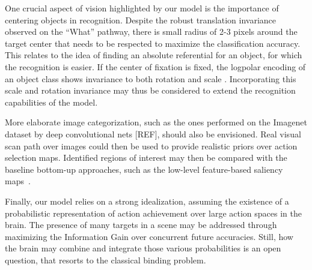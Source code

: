 


One crucial aspect of vision highlighted by our model is the importance of centering objects in recognition. Despite the robust translation invariance observed on the ``What'' pathway, there is small radius of 2-3 pixels around the target center that needs to be respected to maximize the classification accuracy. This relates to the idea of finding an absolute referential for an object, for which the recognition is easier. If the center of fixation is fixed, the logpolar encoding of an object class shows invariance to both rotation and scale \citep{Traver10}. Incorporating this scale and rotation invariance may thus be considered to extend the recognition capabilities of the model.

More elaborate image categorization, such as the ones performed on the Imagenet dataset by deep convolutional nets [REF], should also be envisioned.
Real visual scan path over images could then be used to provide realistic priors over action selection maps.  %
Identified regions of interest may then be compared with the baseline bottom-up approaches, such as the low-level feature-based saliency maps~\citep{Itti01}. 

Finally, our model relies on a strong idealization, assuming the existence of a probabilistic representation of action achievement over large action spaces in the brain. 
The presence of many targets in a scene may be addressed %
through maximizing the Information Gain over concurrent future accuracies. %
Still, how the brain may combine and integrate those various probabilities is an open question, that resorts to the classical binding problem. %
